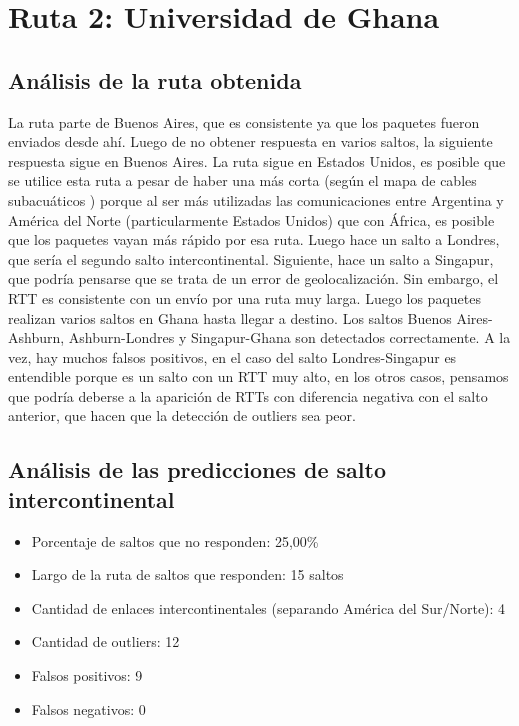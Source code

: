 \section{Ruta 2: Universidad de Ghana}
\subsection{Análisis de la ruta obtenida}

La ruta parte de Buenos Aires, que es consistente ya que los paquetes fueron enviados desde ahí. Luego de no obtener respuesta en varios saltos, la siguiente respuesta sigue en Buenos Aires.
La ruta sigue en Estados Unidos, es posible que se utilice esta ruta a pesar de haber una más corta (según el mapa de cables subacuáticos \cite{cables}) porque al ser más utilizadas las comunicaciones entre Argentina y América del Norte (particularmente Estados Unidos) que con África, es posible que los paquetes vayan más rápido por esa ruta.
Luego hace un salto a Londres, que sería el segundo salto intercontinental. Siguiente, hace un salto a Singapur, que podría pensarse que se trata de un error de geolocalización. Sin embargo, el RTT es consistente con un envío por una ruta muy larga.
Luego los paquetes realizan varios saltos en Ghana hasta llegar a destino. 
Los saltos Buenos Aires-Ashburn, Ashburn-Londres y Singapur-Ghana son detectados correctamente. A la vez, hay muchos falsos positivos, en el caso del salto Londres-Singapur es entendible porque es un salto con un RTT muy alto, en los otros casos, pensamos que podría deberse a la aparición de RTTs con diferencia negativa con el salto anterior, que hacen que la detección de outliers sea peor.

\subsection{Análisis de las predicciones de salto intercontinental}

\begin{itemize}
	\item Porcentaje de saltos que no responden: 25,00\%
	\item Largo de la ruta de saltos que responden: 15 saltos 
	\item Cantidad de enlaces intercontinentales (separando América del Sur/Norte): 4
	\item Cantidad de outliers: 12
	\item Falsos positivos: 9
	\item Falsos negativos: 0
\end{itemize}

